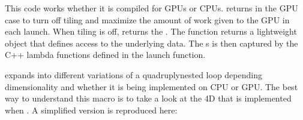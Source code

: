 \documentclass[letterpaper,10pt,english]{sphinxmanual}
\begin{document}
\sphinxAtStartPar
This code works whether it is compiled for GPUs or CPUs. 
returns  in the GPU case to turn off tiling and maximize the amount of
work given to the GPU in each launch. When tiling is off, 
returns the .  The  function returns a
lightweight  object that defines access to the underlying 
data.  The s is then captured by the C++ lambda functions defined in the
launch function.

\sphinxAtStartPar
{} expands into different variations of a quadruply\sphinxhyphen{}nested
 loop depending dimensionality and whether it is being implemented on CPU or GPU.
The best way to understand this macro is to take a look at the 4D 
that is implemented when . A simplified version is reproduced here:
\end{document}
